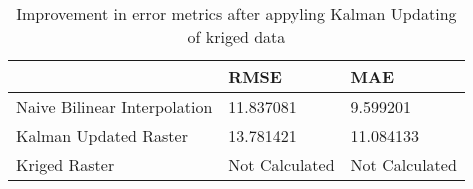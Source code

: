 \begin{table}
\caption{Improvement in error metrics after appyling Kalman Updating of kriged data}
\label{tab:Big_island_lidar_error}
\begin{tabular}{lll}
\toprule
 & RMSE & MAE \\
\midrule
Naive Bilinear Interpolation & 11.837081 & 9.599201 \\
Kalman Updated Raster & 13.781421 & 11.084133 \\
Kriged Raster & Not Calculated & Not Calculated \\
\bottomrule
\end{tabular}
\end{table}

